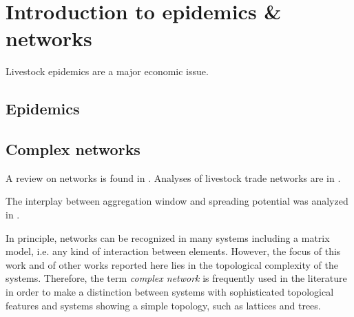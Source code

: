 
\chapter{Introduction to epidemics \& networks}
Livestock epidemics are a major economic issue.

\section{Epidemics}




\section{Complex networks}
A review on networks is found in \citet{Newman2003}.
Analyses of livestock trade networks are in \citet{Christley:2005}
\citet{Bigras:2007}\citet{Green:2006}.

The interplay between aggregation window and spreading potential was analyzed in \citet{Bajardi:2012}.

In principle, networks can be recognized in many systems including a matrix model, i.e. any kind of interaction between elements.
However, the focus of this work and of other works reported here lies in the topological complexity of the systems.
Therefore, the term \emph{complex network} is frequently used in the literature in order to make a distinction between systems with sophisticated topological features and systems showing a simple topology, such as lattices and trees.

